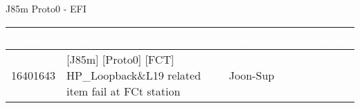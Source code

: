 \documentclass[aspectratio=169]{beamer}
\newcommand{\LowRisk}[1]{\cellcolor{LowRiskColor}#1}
\begin{document}
\begin{frame}{J85m Proto0 - EFI}
    \thispagestyle{fancy}

    \begin{tabularx}{\textwidth}{|l|p{}|l|X|}
        \hline
        \rowcolor{RowBlue}
        \textcolor{white}{Radar} & \textcolor{white}{Task} & \textcolor{white}{Assigned} & \textcolor{white}{Comments} \\
        \hline
        \LowRisk{16401643} & [J85m] [Proto0] [FCT] HP\_Loopback\&L19 related item fail at FCt station & Joon-Sup &  \\
        \hline

    \end{tabularx}
\end{frame}
\end{document}
